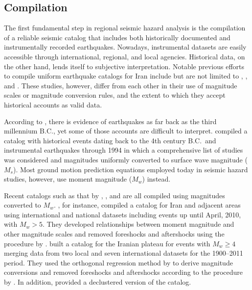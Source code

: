 \subsection{Compilation}

The first fundamental step in regional seismic hazard analysis is the compilation of a reliable seismic catalog that includes both historically documented and instrumentally recorded earthquakes. Nowadays, instrumental datasets are easily accessible through international, regional, and local agencies. Historical data, on the other hand, lends itself to subjective interpretation. Notable previous efforts to compile uniform earthquake catalogs for Iran include but are not limited to \citet{Ambraseys_1982_Book}, \citet{moinfar1994}, and \citet{Berberian_1995_Tech}. These studies, however, differ from each other in their use of magnitude scales or magnitude conversion rules, and the extent to which they accept historical accounts as valid data.

According to \citet{Ambraseys_1982_Book}, there is evidence of earthquakes as far back as the third millennium B.C., yet some of those accounts are difficult to interpret. \citet{Mirzaei1997} compiled a catalog with historical events dating back to the 4th century B.C.~and instrumental earthquakes through 1994 in which a comprehensive list of studies was considered and magnitudes uniformly converted to surface wave magnitude ($M_s$). Most ground motion prediction equations employed today in seismic hazard studies, however, use moment magnitude ($M_w$) instead.

Recent catalogs such as that by \citet{Karimiparidari2013}, \citet{Shahvar2013}, and \citet{Zare2014} are all compiled using magnitudes converted to $M_w$. \citet{Karimiparidari2013}, for instance, compiled a catalog for Iran and adjacent areas using international and national datasets including events up until April, 2010, with $M_w > 5$. They developed relationships between moment magnitude and other magnitude scales and removed foreshocks and aftershocks using the procedure by \citet{Gardner1974}. \citet{Shahvar2013} built a catalog for the Iranian plateau for events with $M_w \geq 4$ merging data from two local and seven international datasets for the 1900--2011 period. They used the orthogonal regression method by \citet{Castellaro2006} to derive magnitude conversions and removed foreshocks and aftershocks according to the procedure by \citet{Uhrhammer_1986_EN}. In addition, \citet{Shahvar2013} provided a declustered version of the catalog.

